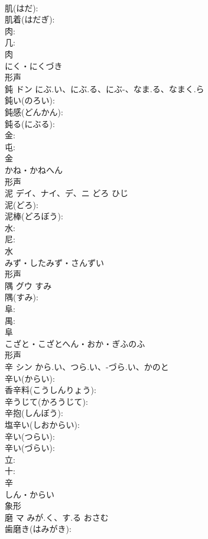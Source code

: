 \documentclass[8pt]{extreport}
\begin{document}
\begin{CJK}{UTF8}{min}
\\	肌(はだ): 
\\	肌着(はだぎ): 
\\	肉: 
\\	几: 
\\	肉	
\\	にく・にくづき	
\\	形声 
\\	鈍	ドン	にぶ.い、にぶ.る、にぶ-、なま.る、なまく.ら		
\\	鈍い(のろい): 
\\	鈍感(どんかん): 
\\	鈍る(にぶる): 
\\	金: 
\\	屯: 
\\	金	
\\	かね・かねへん	
\\	形声 
\\	泥	デイ、ナイ、デ、ニ	どろ	ひじ	
\\	泥(どろ): 
\\	泥棒(どろぼう): 
\\	水: 
\\	尼: 
\\	水	
\\	みず・したみず・さんずい	
\\	形声 
\\	隅	グウ	すみ		
\\	隅(すみ): 
\\	阜: 
\\	禺: 
\\	阜	
\\	こざと・こざとへん・おか・ぎふのふ	
\\	形声 
\\	辛	シン	から.い、つら.い、-づら.い、かのと		
\\	辛い(からい): 
\\	香辛料(こうしんりょう): 
\\	辛うじて(かろうじて): 
\\	辛抱(しんぼう): 
\\	塩辛い(しおからい): 
\\	辛い(つらい): 
\\	辛い(づらい): 
\\	立: 
\\	十: 
\\	辛	
\\	しん・からい	
\\	象形 
\\	磨	マ	みが.く、す.る	おさむ	
\\	歯磨き(はみがき): 

\end{CJK}
\end{document}
